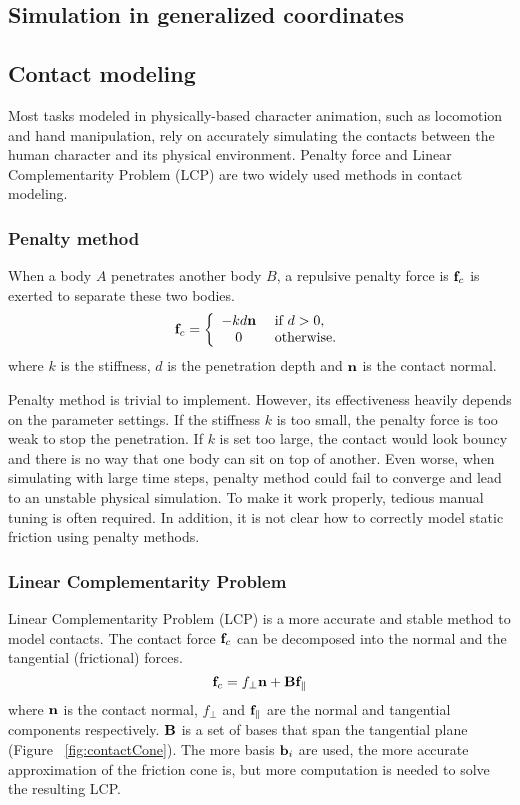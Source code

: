 \subsection{Simulation in generalized coordinates} 


\subsection{Contact modeling}

Most tasks modeled in physically-based character animation, such as locomotion and hand manipulation, rely on accurately simulating the contacts between the human character and its physical environment. Penalty force and Linear Complementarity Problem (LCP) are two widely used methods in contact modeling.

\subsubsection{Penalty method}
When a body $A$ penetrates another body $B$, a repulsive penalty force is $\mathbf{f}_c$ is exerted to separate these two bodies.
\begin{equation}
\mathbf{f}_c=
\left\{
\begin{array}{cl}
-kd\mathbf{n} & \textrm{        if } d > 0,\\
0 & \textrm{        otherwise.}
\end{array}
\right.
\end{equation}
where $k$ is the stiffness, $d$ is the penetration depth and $\mathbf{n}$ is the contact normal. 

Penalty method is trivial to implement. However, its effectiveness heavily depends on the parameter settings. If the stiffness $k$ is too small, the penalty force is too weak to stop the penetration. If $k$ is set too large, the contact would look bouncy and there is no way that one body can sit on top of another. Even worse, when simulating with large time steps, penalty method could fail to converge and lead to an unstable physical simulation. To make it work properly, tedious manual tuning is often required. In addition, it is not clear how to correctly model static friction using penalty methods.

\subsubsection{Linear Complementarity Problem}

Linear Complementarity Problem (LCP) is a more accurate and stable method to model contacts. The contact force $\mathbf{f}_c$ can be decomposed into the normal and the tangential (frictional) forces.
\begin{displaymath}
\mathbf{f}_c = f_\perp\mathbf{n}+\mathbf{B}\mathbf{f}_{\parallel}
\end{displaymath}
where $\mathbf{n}$ is the contact normal, $f_\perp$ and $\mathbf{f}_{\parallel}$ are the normal and tangential components respectively. $\mathbf{B}$ is a set of bases that span the tangential plane (Figure ~\ref{fig:contactCone}). The more basis $\mathbf{b}_i$ are used, the more accurate approximation of the friction cone is, but more computation is needed to solve the resulting LCP. 


